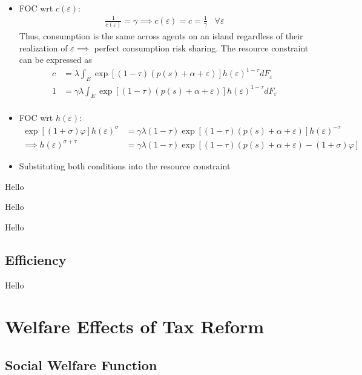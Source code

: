 \documentclass{article}
\begin{document}
\begin{itemize}
\begin{align*}
\end{align*}
\item FOC wrt $c(\varepsilon)$:
\begin{align*}
\frac{1}{c(\varepsilon)} = \gamma \implies c(\varepsilon) = c = \frac{1}{\gamma} \;\;\; \forall \varepsilon
\end{align*}
Thus, consumption is the same across agents on an island regardless of their realization of $\varepsilon \implies$ perfect consumption risk sharing. The resource constraint can be expressed as
\begin{align*}
c
&= \lambda \int_E \exp [(1-\tau)(p(s)+ \alpha + \varepsilon)] h(\varepsilon)^{1-\tau} dF_\varepsilon \\
1
&= \gamma\lambda \int_E \exp [(1-\tau)(p(s)+ \alpha + \varepsilon)] h(\varepsilon)^{1-\tau} dF_\varepsilon \\
\end{align*}

\item FOC wrt $h(\varepsilon)$:
\begin{align*}
\exp[(1+\sigma) \varphi] h(\varepsilon)^{\sigma} &= \gamma \lambda (1-\tau)\exp[(1-\tau)(p(s) + \alpha + \varepsilon)]h(\varepsilon)^{-\tau}\\
\implies
h(\varepsilon)^{\sigma + \tau} &= \gamma \lambda (1-\tau) \exp[(1-\tau)(p(s) + \alpha + \varepsilon)-(1+\sigma) \varphi]
\end{align*}
\item Substituting both conditions into the resource constraint
\end{itemize}

{
\proposition Hello

}

{
\corollary Hello

}

{
\corollary Hello

}

\subsection{Efficiency}

{
\proposition Hello

}

\section{Welfare Effects of Tax Reform}



\subsection{Social Welfare Function}
\end{document}
